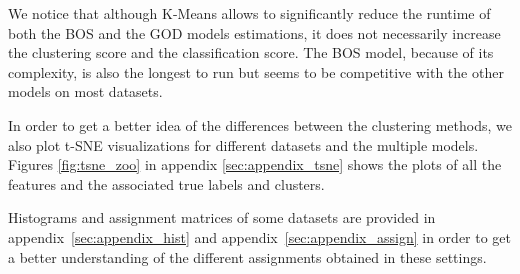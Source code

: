 We notice that although K-Means allows to significantly reduce the runtime of both the BOS and the GOD models estimations, it does not necessarily increase the clustering score and the classification score. The BOS model, because of its complexity, is also the longest to run but seems to be competitive with the other models on most datasets.

In order to get a better idea of the differences between the clustering methods, we also plot t-SNE visualizations \citep{van2008visualizing} for different datasets and the multiple models. Figures \ref{fig:tsne_zoo} in appendix \ref{sec:appendix_tsne} shows the plots of all the features and the associated true labels and clusters.

Histograms and assignment matrices of some datasets are provided in appendix~\ref{sec:appendix_hist} and appendix~\ref{sec:appendix_assign} in order to get a better understanding of the different assignments obtained in these settings.






